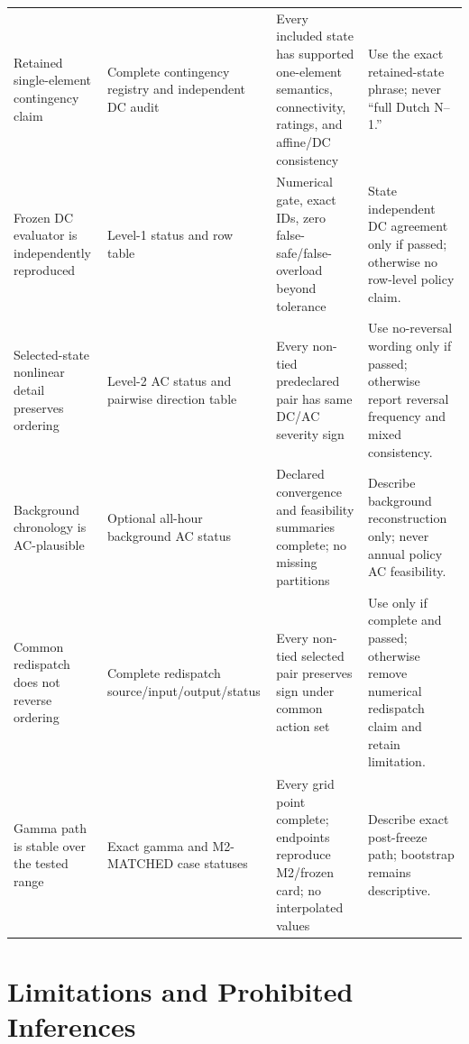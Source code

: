 \documentclass[10pt,journal,onecolumn]{IEEEtran}
\begin{document}
\begin{longtable}{@{}p{}p{}p{}p{}@{}}
Retained single-element contingency claim
& Complete contingency registry and independent DC audit
& Every included state has supported one-element semantics, connectivity, ratings, and affine/DC consistency
& Use the exact retained-state phrase; never ``full Dutch N--1.'' \\
Frozen DC evaluator is independently reproduced
& Level-1 status and row table
& Numerical gate, exact IDs, zero false-safe/false-overload beyond tolerance
& State independent DC agreement only if passed; otherwise no row-level policy claim. \\
Selected-state nonlinear detail preserves ordering
& Level-2 AC status and pairwise direction table
& Every non-tied predeclared pair has same DC/AC severity sign
& Use no-reversal wording only if passed; otherwise report reversal frequency and mixed consistency. \\
Background chronology is AC-plausible
& Optional all-hour background AC status
& Declared convergence and feasibility summaries complete; no missing partitions
& Describe background reconstruction only; never annual policy AC feasibility. \\
Common redispatch does not reverse ordering
& Complete redispatch source/input/output/status
& Every non-tied selected pair preserves sign under common action set
& Use only if complete and passed; otherwise remove numerical redispatch claim and retain limitation. \\
Gamma path is stable over the tested range
& Exact gamma and M2-MATCHED case statuses
& Every grid point complete; endpoints reproduce M2/frozen card; no interpolated values
& Describe exact post-freeze path; bootstrap remains descriptive. \\
\bottomrule
\end{longtable}

\section{Limitations and Prohibited Inferences}
\label{sec:report_limitations}
\end{document}
